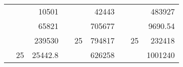 \begin{table}[H]
\begin{tabular}{|ccrccrccc}
\rowcolor[HTML]{DAE8FC} 
\multicolumn{1}{|c|}{\cellcolor[HTML]{FFFFC7}}                                & \multicolumn{1}{c|}{\cellcolor[HTML]{DAE8FC}}                      & \multicolumn{1}{r|}{\cellcolor[HTML]{DAE8FC}10501}     & \multicolumn{1}{c|}{\cellcolor[HTML]{FFFFC7}}                                & \multicolumn{1}{c|}{\cellcolor[HTML]{DAE8FC}}                       & \multicolumn{1}{r|}{\cellcolor[HTML]{DAE8FC}42443}     & \multicolumn{1}{c|}{\cellcolor[HTML]{FFFFC7}}                                & \multicolumn{1}{c|}{\cellcolor[HTML]{DAE8FC}}                      & \multicolumn{1}{r|}{\cellcolor[HTML]{DAE8FC}483927}    \\ \cline{3-3} \cline{6-6} \cline{9-9} 
\multicolumn{1}{|c|}{\cellcolor[HTML]{FFFFC7}}                                & \multicolumn{1}{c|}{\cellcolor[HTML]{DAE8FC}}                      & \multicolumn{1}{r|}{\cellcolor[HTML]{DDFDFF}65821}     & \multicolumn{1}{c|}{\cellcolor[HTML]{FFFFC7}}                                & \multicolumn{1}{c|}{\cellcolor[HTML]{DAE8FC}}                       & \multicolumn{1}{r|}{\cellcolor[HTML]{DDFDFF}705677}    & \multicolumn{1}{c|}{\cellcolor[HTML]{FFFFC7}}                                & \multicolumn{1}{c|}{\cellcolor[HTML]{DAE8FC}}                      & \multicolumn{1}{r|}{\cellcolor[HTML]{DDFDFF}9690.54}   \\ \cline{3-3} \cline{6-6} \cline{9-9} 
\rowcolor[HTML]{DAE8FC} 
\multicolumn{1}{|c|}{\cellcolor[HTML]{FFFFC7}}                                & \multicolumn{1}{c|}{\cellcolor[HTML]{DAE8FC}}                      & \multicolumn{1}{r|}{\cellcolor[HTML]{DAE8FC}239530}    & \multicolumn{1}{c|}{\cellcolor[HTML]{FFFFC7}}                                & \multicolumn{1}{c|}{\multirow{-9}{*}{\cellcolor[HTML]{DAE8FC}25}}   & \multicolumn{1}{r|}{\cellcolor[HTML]{DAE8FC}794817}    & \multicolumn{1}{c|}{\cellcolor[HTML]{FFFFC7}}                                & \multicolumn{1}{c|}{\multirow{-9}{*}{\cellcolor[HTML]{DAE8FC}25}}  & \multicolumn{1}{r|}{\cellcolor[HTML]{DAE8FC}232418}    \\ \cline{3-3} \cline{5-6} \cline{8-9} 
\multicolumn{1}{|c|}{\cellcolor[HTML]{FFFFC7}}                                & \multicolumn{1}{c|}{\multirow{-10}{*}{\cellcolor[HTML]{DAE8FC}25}} & \multicolumn{1}{r|}{\cellcolor[HTML]{DDFDFF}25442.8}   & \multicolumn{1}{c|}{\cellcolor[HTML]{FFFFC7}}                                & \multicolumn{1}{c|}{\cellcolor[HTML]{DDFDFF}}                       & \multicolumn{1}{r|}{\cellcolor[HTML]{DAE8FC}626258}    & \multicolumn{1}{c|}{\cellcolor[HTML]{FFFFC7}}                                & \multicolumn{1}{c|}{\cellcolor[HTML]{DDFDFF}}                      & \multicolumn{1}{r|}{\cellcolor[HTML]{DAE8FC}1001240}   \\ \cline{2-3} \cline{6-6} \cline{9-9} 

\end{tabular}
\end{table}
